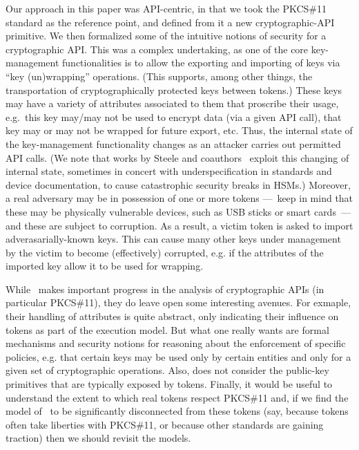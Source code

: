 Our approach in this paper was API-centric, in that we took the PKCS\#11
standard as the reference point, and defined from it a new cryptographic-API
primitive.
%
%
We then formalized some of the intuitive notions of security for a
cryptographic API.  This was a complex undertaking, as one of the core
key-management functionalities is to allow the exporting and importing of keys
via ``key (un)wrapping'' operations.  (This supports, among other things, the
transportation of cryptographically protected keys between tokens.)  These keys
may have a variety of attributes associated to them that proscribe their usage,
e.g.\ this key may/may not be used to encrypt data (via a given API call), that
key may or may not be wrapped for future export, etc.  Thus, the internal state of
the key-management functionality changes as an attacker carries out permitted
API calls. (We note that works by Steele and
coauthors~\cite{KS13}
exploit this changing of internal state, sometimes in concert with
underspecification in standards and device documentation, to cause catastrophic
security breaks in HSMs.) Moreover, a real adversary may be in possession of one
or more tokens ---~keep in mind that these may be physically vulnerable devices,
such as USB sticks or smart cards~--- and these are subject to corruption.  As a
result, a victim token is asked to import adverasarially-known keys.  This can
cause many other keys under management by the victim to become (effectively)
corrupted, e.g. if the attributes of the imported key allow it to be used for
wrapping.
%

While~\cite{SSW} makes important progress in the analysis of
cryptographic APIs (in particular PKCS\#11), they do leave open some
interesting avenues.  For exmaple, their handling of attributes is
quite abstract, only indicating their influence on tokens as part of
the execution model.  But what one really wants are formal mechanisms and
security notions for reasoning about the enforcement of specific
policies, e.g. that certain keys may be used only by certain entities
and only for a given set of cryptographic operations.  Also,
\cite{SSW} does not consider the public-key primitives that are
typically exposed by tokens.  Finally, it would be useful to
understand the extent to which real tokens respect PKCS\#11 and, if we
find the model of~\cite{SSW} to be significantly disconnected from
these tokens (say, because tokens often take liberties with PKCS\#11,
or because other standards are gaining traction) then we should
revisit the models.

